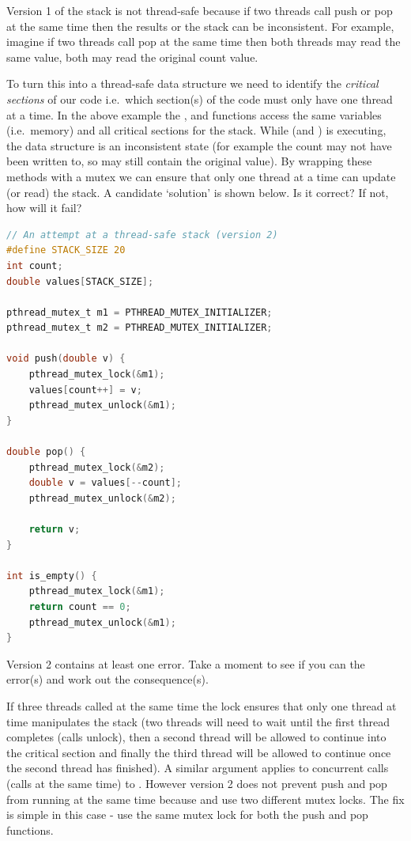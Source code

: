 Version 1 of the stack is not thread-safe because if two threads call push or pop at the same time then the results or the stack can be inconsistent.
For example, imagine if two threads call pop at the same time then both threads may read the same value, both may read the original count value.

To turn this into a thread-safe data structure we need to identify the \emph{critical sections} of our code i.e.~which section(s) of the code must only have one thread at a time.
In the above example the , and  functions access the same variables (i.e.~memory) and all critical sections for the stack.
While  (and ) is executing, the data structure is an inconsistent state (for example the count may not have been written to, so may still contain the original value).
By wrapping these methods with a mutex we can ensure that only one thread at a time can update (or read) the stack. A candidate `solution' is shown below.
Is it correct? If not, how will it fail?

\begin{lstlisting}[language=C]
// An attempt at a thread-safe stack (version 2)
#define STACK_SIZE 20
int count;
double values[STACK_SIZE];

pthread_mutex_t m1 = PTHREAD_MUTEX_INITIALIZER;
pthread_mutex_t m2 = PTHREAD_MUTEX_INITIALIZER;

void push(double v) { 
    pthread_mutex_lock(&m1);
    values[count++] = v;
    pthread_mutex_unlock(&m1);
}

double pop() {
    pthread_mutex_lock(&m2);
    double v = values[--count];
    pthread_mutex_unlock(&m2);

    return v;
}

int is_empty() {
    pthread_mutex_lock(&m1);
    return count == 0;
    pthread_mutex_unlock(&m1);
}
\end{lstlisting}

Version 2 contains at least one error.
Take a moment to see if you can the error(s) and work out the consequence(s).

If three threads called  at the same time the lock  ensures that only one thread at time manipulates the stack (two threads will need to wait until the first thread completes (calls unlock), then a second thread will be allowed to continue into the critical section and finally the third thread will be allowed to continue once the second thread has finished).
A similar argument applies to concurrent calls (calls at the same time) to . However version 2 does not prevent push and pop from running at the same time because  and  use two different mutex locks. The fix is simple in this case - use the same mutex lock for both the push and pop functions.

